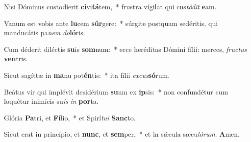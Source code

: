 \setcounter{versecount}{2}

\vs Nisi Dóminus custodíerit \textbf{ci}vi\textbf{tá}tem,~* frustra vígilat qui cus\textit{tó}\textit{dit} \textbf{e}am.

\vs Vanum est vobis ante \textbf{lu}cem \textbf{súr}gere:~* súrgite postquam sedéritis, qui manducátis pa\textit{nem} \textit{do}\textbf{ló}ris.

\vs Cum déderit diléctis \textbf{su}is \textbf{som}num:~* ecce heréditas Dómini fílii: merces, \textit{fruc}\textit{tus} \textbf{ven}tris.

\vs Sicut sagíttæ in \textbf{ma}nu pot\textbf{én}tis:~* ita fílii \textit{ex}\textit{cus}\textbf{só}rum.

\vs Beátus vir qui implévit desidérium \textbf{su}um ex \textbf{ip}sis:~* non confundétur cum loquétur inimícis su\textit{is} \textit{in} \textbf{por}ta.

\vs Glória \textbf{Pa}tri, et \textbf{Fí}lio,~* et Spirí\textit{tu}\textit{i} \textbf{Sanc}to.

\vs Sicut erat in princípio, et \textbf{nunc}, et \textbf{sem}per,~* et in sǽcula sæcu\textit{ló}\textit{rum}. \textbf{A}men.

